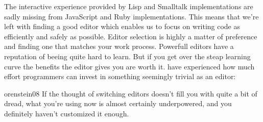 The interactive experience provided by Lisp and Smalltalk implementations are
sadly missing%
from JavaScript and Ruby implementations. This means that we're left with
finding a good editor which enables us to focus on writing code as efficiently
and safely as possible. Editor selection is highly a matter of preference and
finding one that matches your work process. Powerfull editors have a
reputation of beeing quite hard to learn. But if you get over the steap
learning curve the benefits the editor gives you are worth it.
\citeauthor{orenstein08} have experienced how much effort programmers can
invest in something seemingly trivial as an editor:

\begin{citequote}{orenstein08}
  If the thought of switching editors doesn't fill you with quite a bit of
  dread, what you're using now is almost certainly underpowered, and you
  definitely haven't customized it enough.
\end{citequote}


